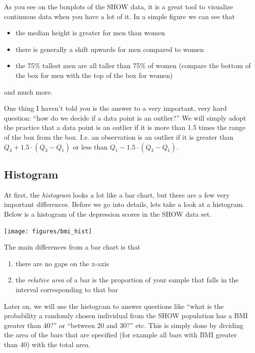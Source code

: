 \documentclass[]{book}
\providecommand{\tightlist}{%
  \setlength{\itemsep}{0pt}\setlength{\parskip}{0pt}}
\theoremstyle{definition}
\theoremstyle{definition}
\theoremstyle{definition}
\theoremstyle{remark}
\begin{document}
As you see on the boxplots of the SHOW data, it is a great tool to visualize continuous data when you have a lot of it. In a simple figure we can see that

\begin{itemize}
\tightlist
\item
  the median height is greater for men than women
\item
  there is generally a shift upwards for men compared to women
\item
  the 75\% tallest men are all taller than 75\% of women (compare the bottom of the box for men with the top of the box for women)
\end{itemize}

and much more.

One thing I haven't told you is the answer to a very important, very hard question: ``how do we decide if a data point is an outlier?'' We will simply adopt the practice that a data point is an outlier if it is more than 1.5 times the range of the box from the box. I.e. an observation is an outlier if it is greater than \(Q_3 + 1.5\cdot (Q_3 - Q_1)\) or less than \(Q_1 - 1.5\cdot (Q_3 - Q_1)\).

\hypertarget{histogram}{%
\subsection{Histogram}\label{histogram}}

At first, the \emph{histogram} looks a lot like a bar chart, but there are a few very important differences. Before we go into details, lets take a look at a histogram. Below is a histogram of the depression scores in the SHOW data set.

\texttt{[image: figures/bmi\_hist]}

The main differences from a bar chart is that

\begin{enumerate}
\def\labelenumi{\arabic{enumi}.}
\tightlist
\item
  there are no gaps on the x-axis
\item
  the \emph{relative area} of a bar is the proportion of your sample that falls in the interval corresponding to that bar
\end{enumerate}

Later on, we will use the histogram to answer questions like ``what is the probability a randomly chosen individual from the SHOW population has a BMI greater than 40?'' or ``between 20 and 30?'' etc. This is simply done by dividing the area of the bars that are specified (for example all bars with BMI greater than 40) with the total area.
\end{document}
